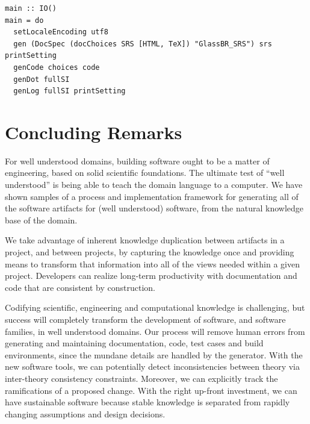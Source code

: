 \documentclass[sigconf,review,anonymous=false]{acmart}
\begin{document}
\begin{lstlisting}
main :: IO()
main = do
  setLocaleEncoding utf8
  gen (DocSpec (docChoices SRS [HTML, TeX]) "GlassBR_SRS") srs printSetting
  genCode choices code
  genDot fullSI
  genLog fullSI printSetting
\end{lstlisting}

\section{Concluding Remarks} \label{ch:concluding_remarks}

For well understood domains, building software ought to be a matter of
engineering, based on solid scientific foundations. The ultimate test of ``well
understood'' is being able to teach the domain language to a computer. We have
shown samples of a process and implementation framework for generating all of
the software artifacts for (well understood) software, from the natural
knowledge base of the domain.

We take advantage of inherent knowledge duplication between artifacts in a
project, and between projects, by capturing the knowledge once and providing
means to transform that information into all of the views needed within a given
project.  Developers can realize long-term productivity with documentation and
code that are consistent by construction.

Codifying scientific, engineering and computational knowledge is challenging,
but success will completely transform the development of software, and software
families, in well understood domains. Our process will remove human errors from
generating and maintaining documentation, code, test cases and build
environments, since the mundane details are handled by the generator.  With the
new software tools, we can potentially detect inconsistencies between theory via
inter-theory consistency constraints. Moreover, we can explicitly track the
ramifications of a proposed change.  With the right up-front investment, we can
have sustainable software because stable knowledge is separated from rapidly
changing assumptions and design decisions.



\end{document}
